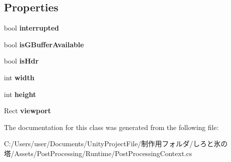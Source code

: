 \subsection*{Properties}
\begin{DoxyCompactItemize}
\item 
\mbox{\label{class_unity_engine_1_1_post_processing_1_1_post_processing_context_ab93ab5b37f664bd229c322164ca5bf70}} 
bool {\bfseries interrupted}
\item 
\mbox{\label{class_unity_engine_1_1_post_processing_1_1_post_processing_context_ac66f43731d1ae15bb7d0b1fb2884826e}} 
bool {\bfseries is\+G\+Buffer\+Available}
\item 
\mbox{\label{class_unity_engine_1_1_post_processing_1_1_post_processing_context_a4b5a681cde9e4aca82c23981d2130539}} 
bool {\bfseries is\+Hdr}
\item 
\mbox{\label{class_unity_engine_1_1_post_processing_1_1_post_processing_context_a6998d843d59216ccb88e6fd343fb7306}} 
int {\bfseries width}
\item 
\mbox{\label{class_unity_engine_1_1_post_processing_1_1_post_processing_context_ab1c293d501b4437e15c58d98b07c8b4b}} 
int {\bfseries height}
\item 
\mbox{\label{class_unity_engine_1_1_post_processing_1_1_post_processing_context_a8a1709dc0cdb5e5f7db01f7723f4baf3}} 
Rect {\bfseries viewport}
\end{DoxyCompactItemize}


The documentation for this class was generated from the following file\+:\begin{DoxyCompactItemize}
\item 
C\+:/\+Users/user/\+Documents/\+Unity\+Project\+File/制作用フォルダ/しろと氷の塔/\+Assets/\+Post\+Processing/\+Runtime/Post\+Processing\+Context.\+cs\end{DoxyCompactItemize}
